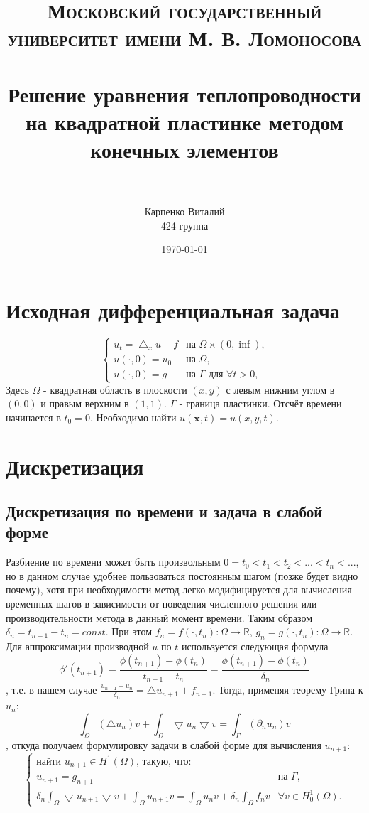 \documentclass[paper=a4, fontsize=13pt]{scrartcl} %
\title{
\normalfont \normalsize
\textsc{Московский государственный университет имени М. В. Ломоносова} \\ [25pt] %
\horrule{0.5pt} \\[0.4cm] %
\huge Решение уравнения теплопроводности на квадратной пластинке методом конечных элементов  \\ %
\horrule{2pt} \\[0.5cm] %
}
\author{Карпенко Виталий \\
424 группа} %
\date{\normalsize\today} %
\numberwithin{equation}{section} %
\numberwithin{figure}{section} %
\numberwithin{table}{section} %
\begin{document}
\maketitle %

\section{Исходная дифференциальная задача}
    \[
        \begin{cases}
            u_t = \bigtriangleup_x u + f& \text{на $\Omega \times (0, \inf)$,} \\
            u(\cdot, 0) = u_0& \text{на $\Omega$}, \\
            u(\cdot, 0) = g& \text{на $\Gamma$ для $\forall t > 0$,}
        \end{cases}
    \]
Здесь $\Omega$ - квадратная область в плоскости $(x, y)$ с левым нижним углом в $(0, 0)$ и правым верхним в $(1, 1)$.
$\Gamma$ - граница пластинки. Отсчёт времени начинается в $t_0 = 0$. Необходимо найти $u(\bm{x}, t) = u(x, y, t)$.
\section{Дискретизация}
\subsection{Дискретизация по времени и задача в слабой форме}
Разбиение по времени может быть произвольным $0 = t_0 < t_1 < t_2 < ... < t_n < ...$, но в данном случае удобнее пользоваться постоянным шагом (позже будет видно почему), хотя при необходимости метод легко модифицируется для вычисления временных шагов в зависимости от поведения численного решения или производительности метода в данный момент времени. Таким образом $\delta_n = t_{n+1} - t_n = const$.
При этом $f_n = f(\cdot, t_n) : \Omega \rightarrow \mathbb{R}$, $g_n = g(\cdot, t_n) : \Omega \rightarrow \mathbb{R}$.
Для аппроксимации производной $u$ по $t$ используется следующая формула $$\phi'(t_{n+1}) = \frac{\phi(t_{n+1}) - \phi(t_{n})}{t_{n+1} - t_{n}} = \frac{\phi(t_{n+1}) - \phi(t_{n})}{\delta_n}$$, т.е. в нашем случае $\frac{u_{n+1} - u_n}{\delta_n} = \bigtriangleup u_{n+1} + f_{n+1}$.
Тогда, применяя теорему Грина к $u_n$: $$\int_{\Omega}(\bigtriangleup u_n)v + \int_{\Omega}\bigtriangledown u_n \bigtriangledown v = \int_{\Gamma}(\partial_n u_n)v$$, откуда получаем формулировку задачи в слабой форме для вычисления $u_{n+1}$:
    \[
        \begin{cases}
            \text{найти } u_{n+1} \in H^1(\Omega)\text{, такую, что:} \\
            u_{n+1} = g_{n+1}& \text{на $\Gamma$,} \\
            \delta_n \int_{\Omega} \bigtriangledown u_{n+1} \bigtriangledown v + \int_{\Omega} u_{n+1}v = \int_{\Omega} u_{n}v + \delta_n \int_{\Omega} f_{n}v& \forall v \in H^1_0(\Omega).
        \end{cases}
    \]
\end{document}
